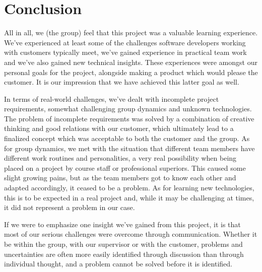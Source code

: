 \section{Conclusion}

All in all, we (the group) feel that this project was a valuable learning
experience. We've experienced at least some of the challenges software
developers working with customers typically meet, we've gained experience
in practical team work and we've also gained new technical insights. These
experiences were amongst our personal goals for the project, alongside making
a product which would please the customer. It is our impression that we have
achieved this latter goal as well.

In terms of real-world challenges, we've dealt with incomplete project
requirements, somewhat challenging group dynamics and unknown technologies.
The problem of incomplete requirements was solved by a combination of creative
thinking and good relations with our customer, which ultimately lead to a
finalized concept which was acceptable to both the customer and the group.
As for group dynamics, we met with the situation that different team members
have different work routines and personalities, a very real possibility when
being placed on a project by course staff or professional superiors. This
caused some slight growing pains, but as the team members got to know each
other and adapted accordingly, it ceased to be a problem. As for learning new
technologies, this is to be expected in a real project and, while it may be
challenging at times, it did not represent a problem in our case.

If we were to emphasize one insight we've gained from this project, it is that
most of our serious challenges were overcome through communication. Whether it
be within the group, with our supervisor or with the customer, problems and
uncertainties are often more easily identified through discussion than through
individual thought, and a problem cannot be solved before it is identified.
